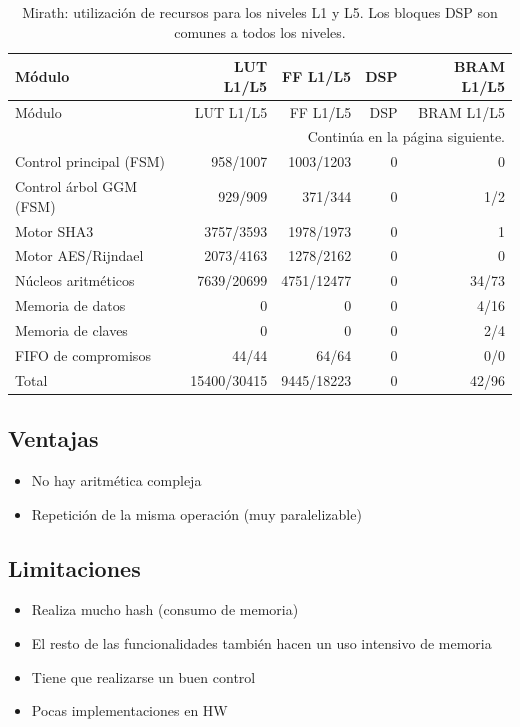 \begingroup
\small
\setlength{\tabcolsep}{3pt}
\setlength{\LTcapwidth}{\textwidth}
\begin{longtable}{lrrrr}
\caption{Mirath: utilización de recursos para los niveles L1 y L5. Los bloques DSP son comunes a todos los niveles.}\label{tab:eval-mirath}\\
\toprule
Módulo & LUT L1/L5 & FF L1/L5 & DSP & BRAM L1/L5 \\
\midrule
\endfirsthead
\toprule
Módulo & LUT L1/L5 & FF L1/L5 & DSP & BRAM L1/L5 \\
\midrule
\endhead
\midrule
\multicolumn{5}{r}{\small Continúa en la página siguiente.}\\
\endfoot
\bottomrule
\endlastfoot
{Control principal (FSM)} & {958/1007} & {1003/1203} & {0} & {0} \\
{Control árbol GGM (FSM)} & {929/909} & {371/344} & {0} & {1/2} \\
{Motor SHA3} & {3757/3593} & {1978/1973} & {0} & {1} \\
{Motor AES/Rijndael} & {2073/4163} & {1278/2162} & {0} & {0} \\
{Núcleos aritméticos} & {7639/20699} & {4751/12477} & {0} & {34/73} \\
{Memoria de datos} & {0} & {0} & {0} & {4/16} \\
{Memoria de claves} & {0} & {0} & {0} & {2/4} \\
{FIFO de compromisos} & {44/44} & {64/64} & {0} & {0/0} \\
{Total} & {15400/30415} & {9445/18223} & {0} & {42/96} \\
\end{longtable}
\endgroup


\subsection*{Ventajas}
\begin{itemize}
\item No hay aritmética compleja
\item Repetición de la misma operación (muy paralelizable)
\end{itemize}

\subsection*{Limitaciones}
\begin{itemize}
\item Realiza mucho hash (consumo de memoria)
\item El resto de las funcionalidades también hacen un uso intensivo de memoria
\item Tiene que realizarse un buen control
\item Pocas implementaciones en HW
\end{itemize}

